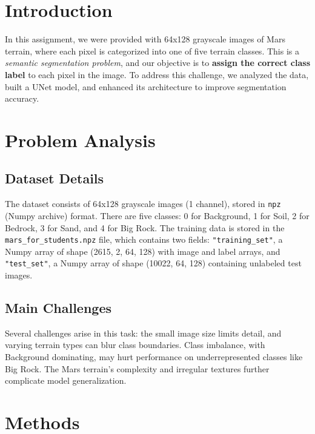 \documentclass[11pt]{article}
\begin{document}
    \begin{multicols}{2}
        
        \section{Introduction}
        In this assignment, we were provided with 64x128 grayscale images of Mars terrain, where each pixel is categorized into one of five terrain classes. This is a \textit{semantic segmentation problem}, and our objective is to \textbf{assign the correct class label} to each pixel in the image. To address this challenge, we analyzed the data, built a UNet model, and enhanced its architecture to improve segmentation accuracy.

        
        \section{Problem Analysis}
        \subsection{Dataset Details}
        
        The dataset consists of 64x128 grayscale images (1 channel), stored in \texttt{npz} (Numpy archive) format. There are five classes: 0 for Background, 1 for Soil, 2 for Bedrock, 3 for Sand, and 4 for Big Rock. The training data is stored in the \texttt{mars\_for\_students.npz} file, which contains two fields: \texttt{"training\_set"}, a Numpy array of shape (2615, 2, 64, 128) with image and label arrays, and \texttt{"test\_set"}, a Numpy array of shape (10022, 64, 128) containing unlabeled test images.
        
        \subsection{Main Challenges}
        
        Several challenges arise in this task: the small image size limits detail, and varying terrain types can blur class boundaries. Class imbalance, with Background dominating, may hurt performance on underrepresented classes like Big Rock. The Mars terrain’s complexity and irregular textures further complicate model generalization.
        
        \section{Methods}
        

\end{multicols}
\end{document}
